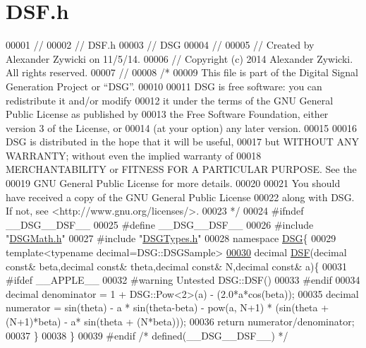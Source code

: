 \hypertarget{_d_s_f_8h_source}{\section{D\+S\+F.\+h}
\label{_d_s_f_8h_source}
}

\begin{DoxyCode}
00001 \textcolor{comment}{//}
00002 \textcolor{comment}{//  DSF.h}
00003 \textcolor{comment}{//  DSG}
00004 \textcolor{comment}{//}
00005 \textcolor{comment}{//  Created by Alexander Zywicki on 11/5/14.}
00006 \textcolor{comment}{//  Copyright (c) 2014 Alexander Zywicki. All rights reserved.}
00007 \textcolor{comment}{//}
00008 \textcolor{comment}{/*}
00009 \textcolor{comment}{ This file is part of the Digital Signal Generation Project or “DSG”.}
00010 \textcolor{comment}{}
00011 \textcolor{comment}{ DSG is free software: you can redistribute it and/or modify}
00012 \textcolor{comment}{ it under the terms of the GNU General Public License as published by}
00013 \textcolor{comment}{ the Free Software Foundation, either version 3 of the License, or}
00014 \textcolor{comment}{ (at your option) any later version.}
00015 \textcolor{comment}{}
00016 \textcolor{comment}{ DSG is distributed in the hope that it will be useful,}
00017 \textcolor{comment}{ but WITHOUT ANY WARRANTY; without even the implied warranty of}
00018 \textcolor{comment}{ MERCHANTABILITY or FITNESS FOR A PARTICULAR PURPOSE.  See the}
00019 \textcolor{comment}{ GNU General Public License for more details.}
00020 \textcolor{comment}{}
00021 \textcolor{comment}{ You should have received a copy of the GNU General Public License}
00022 \textcolor{comment}{ along with DSG.  If not, see <http://www.gnu.org/licenses/>.}
00023 \textcolor{comment}{ */}
00024 \textcolor{preprocessor}{#ifndef \_\_DSG\_\_DSF\_\_}
00025 \textcolor{preprocessor}{#define \_\_DSG\_\_DSF\_\_}
00026 \textcolor{preprocessor}{#include "\hyperlink{_d_s_g_math_8h}{DSGMath.h}"}
00027 \textcolor{preprocessor}{#include "\hyperlink{_d_s_g_types_8h}{DSGTypes.h}"}
00028 \textcolor{keyword}{namespace }\hyperlink{namespace_d_s_g}{DSG}\{
00029     \textcolor{keyword}{template}<\textcolor{keyword}{typename} decimal=DSG::DSGSample>
\hypertarget{_d_s_f_8h_source_l00030}{}\hyperlink{namespace_d_s_g_aac6959add6359f512191ddcd17fd6373}{00030}     decimal \hyperlink{namespace_d_s_g_aac6959add6359f512191ddcd17fd6373}{DSF}(decimal \textcolor{keyword}{const}& beta,decimal \textcolor{keyword}{const}& theta,decimal \textcolor{keyword}{const}& N,decimal \textcolor{keyword}{const}& a)\{
00031 \textcolor{preprocessor}{#ifdef \_\_APPLE\_\_}
00032 \textcolor{preprocessor}{#warning Untested DSG::DSF()}
00033 \textcolor{preprocessor}{#endif}
00034         decimal denominator = 1 + DSG::Pow<2>(a) - (2.0*a*cos(beta));
00035         decimal numerator = sin(theta) - a * sin(theta-beta) - pow(a, N+1) * (sin(theta + (N+1)*beta) - a*
      sin(theta + (N*beta)));
00036         \textcolor{keywordflow}{return} numerator/denominator;
00037     \}
00038 \}
00039 \textcolor{preprocessor}{#endif }\textcolor{comment}{/* defined(\_\_DSG\_\_DSF\_\_) */}\textcolor{preprocessor}{}
\end{DoxyCode}

